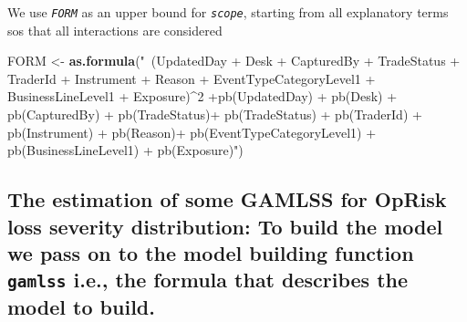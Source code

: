 \documentclass[
]{article}
\newenvironment{Shaded}{\begin{snugshade}}{\end{snugshade}}
\newcommand{\DataTypeTok}[1]{\textcolor[rgb]{0.13,0.29,0.53}{#1}}
\newcommand{\DecValTok}[1]{\textcolor[rgb]{0.00,0.00,0.81}{#1}}
\newcommand{\KeywordTok}[1]{\textcolor[rgb]{0.13,0.29,0.53}{\textbf{#1}}}
\newcommand{\NormalTok}[1]{#1}
\newcommand{\OperatorTok}[1]{\textcolor[rgb]{0.81,0.36,0.00}{\textbf{#1}}}
\newcommand{\StringTok}[1]{\textcolor[rgb]{0.31,0.60,0.02}{#1}}
\begin{document}
\normalsize

We use \emph{\texttt{FORM}} as an upper bound for \emph{\texttt{scope}},
starting from all explanatory terms sos that all interactions are
considered

\small

\begin{Shaded}
\begin{Highlighting}[]
\NormalTok{FORM <-}\StringTok{ }\KeywordTok{as.formula}\NormalTok{(}\StringTok{"~(UpdatedDay + Desk + CapturedBy + TradeStatus + TraderId}
\StringTok{+ Instrument + Reason + EventTypeCategoryLevel1 + BusinessLineLevel1 + Exposure)^2}
\StringTok{+pb(UpdatedDay) + pb(Desk) + pb(CapturedBy) + pb(TradeStatus)+ pb(TradeStatus)}
\StringTok{+ pb(TraderId) + pb(Instrument) + pb(Reason)+ pb(EventTypeCategoryLevel1) }
\StringTok{+ pb(BusinessLineLevel1) + pb(Exposure)"}\NormalTok{)}
\end{Highlighting}
\end{Shaded}

\normalsize

\subsection{The estimation of some GAMLSS for OpRisk loss severity distribution: To build the model we pass on to the model building function \texttt{gamlss} i.e., the formula that describes the model to build.}
\label{sec:The estimation of some GAMLSS for OpRisk loss severity distribution}

\small

\begin{Shaded}
\end{Shaded}

\normalsize
\end{document}
